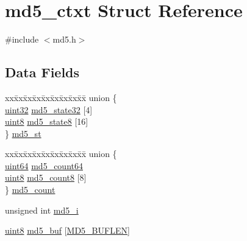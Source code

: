 \hypertarget{structmd5__ctxt}{\section{md5\-\_\-ctxt Struct Reference}
\label{structmd5__ctxt}
}


{\ttfamily \#include $<$md5.\-h$>$}

\subsection*{Data Fields}
\begin{DoxyCompactItemize}
\item 
\begin{tabbing}
xx\=xx\=xx\=xx\=xx\=xx\=xx\=xx\=xx\=\kill
union \{\\
\>\hyperlink{c_8h_a1134b580f8da4de94ca6b1de4d37975e}{uint32} \hyperlink{structmd5__ctxt_a79eaaa7daf441c0716ca44d54cf2f528}{md5\_state32} \mbox{[}4\mbox{]}\\
\>\hyperlink{c_8h_adde6aaee8457bee49c2a92621fe22b79}{uint8} \hyperlink{structmd5__ctxt_a7be28cf899bb2c8105106369665b9400}{md5\_state8} \mbox{[}16\mbox{]}\\
\} \hyperlink{structmd5__ctxt_a146b2c7717909a02905a63c19afbb964}{md5\_st}\\

\end{tabbing}\item 
\begin{tabbing}
xx\=xx\=xx\=xx\=xx\=xx\=xx\=xx\=xx\=\kill
union \{\\
\>\hyperlink{c_8h_af68cb4c1926b997d49286c1e0c7fa68a}{uint64} \hyperlink{structmd5__ctxt_afe0283d08ff6dcf3e57076fd60511f73}{md5\_count64}\\
\>\hyperlink{c_8h_adde6aaee8457bee49c2a92621fe22b79}{uint8} \hyperlink{structmd5__ctxt_a1a4ecd8cf6c7b3f9ceda0eeb12892706}{md5\_count8} \mbox{[}8\mbox{]}\\
\} \hyperlink{structmd5__ctxt_a17a80dc2308d86fd529e4ee3bfc6892d}{md5\_count}\\

\end{tabbing}\item 
unsigned int \hyperlink{structmd5__ctxt_af3502865669a9b4140fa45c87f415c24}{md5\-\_\-i}
\item 
\hyperlink{c_8h_adde6aaee8457bee49c2a92621fe22b79}{uint8} \hyperlink{structmd5__ctxt_af33a6ae2188084f68a777f09db3a6c12}{md5\-\_\-buf} \mbox{[}\hyperlink{md5_8h_a6b39a21088ab28a667f614a5e486d206}{M\-D5\-\_\-\-B\-U\-F\-L\-E\-N}\mbox{]}
\end{DoxyCompactItemize}


